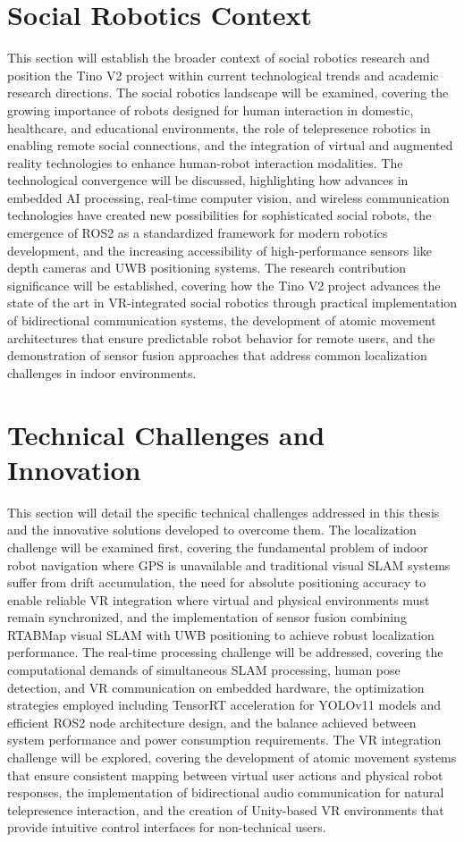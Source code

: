 \section{Social Robotics Context}
This section will establish the broader context of social robotics research and position the Tino V2 project within current technological trends and academic research directions. The social robotics landscape will be examined, covering the growing importance of robots designed for human interaction in domestic, healthcare, and educational environments, the role of telepresence robotics in enabling remote social connections, and the integration of virtual and augmented reality technologies to enhance human-robot interaction modalities. The technological convergence will be discussed, highlighting how advances in embedded AI processing, real-time computer vision, and wireless communication technologies have created new possibilities for sophisticated social robots, the emergence of ROS2 as a standardized framework for modern robotics development, and the increasing accessibility of high-performance sensors like depth cameras and UWB positioning systems. The research contribution significance will be established, covering how the Tino V2 project advances the state of the art in VR-integrated social robotics through practical implementation of bidirectional communication systems, the development of atomic movement architectures that ensure predictable robot behavior for remote users, and the demonstration of sensor fusion approaches that address common localization challenges in indoor environments.

\section{Technical Challenges and Innovation}
This section will detail the specific technical challenges addressed in this thesis and the innovative solutions developed to overcome them. The localization challenge will be examined first, covering the fundamental problem of indoor robot navigation where GPS is unavailable and traditional visual SLAM systems suffer from drift accumulation, the need for absolute positioning accuracy to enable reliable VR integration where virtual and physical environments must remain synchronized, and the implementation of sensor fusion combining RTABMap visual SLAM with UWB positioning to achieve robust localization performance. The real-time processing challenge will be addressed, covering the computational demands of simultaneous SLAM processing, human pose detection, and VR communication on embedded hardware, the optimization strategies employed including TensorRT acceleration for YOLOv11 models and efficient ROS2 node architecture design, and the balance achieved between system performance and power consumption requirements. The VR integration challenge will be explored, covering the development of atomic movement systems that ensure consistent mapping between virtual user actions and physical robot responses, the implementation of bidirectional audio communication for natural telepresence interaction, and the creation of Unity-based VR environments that provide intuitive control interfaces for non-technical users.

